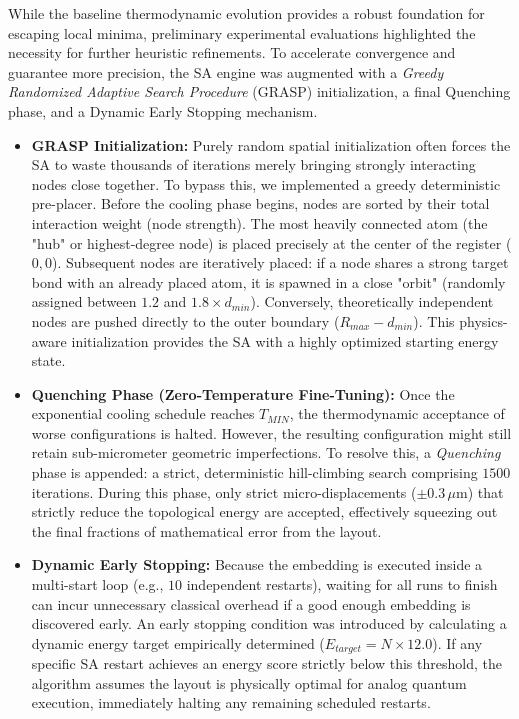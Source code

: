 While the baseline thermodynamic evolution provides a robust foundation for escaping local minima, preliminary experimental evaluations highlighted the necessity for further heuristic refinements. To accelerate convergence and guarantee more precision, the SA engine was augmented with a \textit{Greedy Randomized Adaptive Search Procedure} (GRASP) initialization, a final Quenching phase, and a Dynamic Early Stopping mechanism.

\begin{itemize}
    \item \textbf{GRASP Initialization:} Purely random spatial initialization often forces the SA to waste thousands of iterations merely bringing strongly interacting nodes close together. To bypass this, we implemented a greedy deterministic pre-placer. Before the cooling phase begins, nodes are sorted by their total interaction weight (node strength). The most heavily connected atom (the "hub" or highest-degree node) is placed precisely at the center of the register ($0, 0$). Subsequent nodes are iteratively placed: if a node shares a strong target bond with an already placed atom, it is spawned in a close "orbit" (randomly assigned between $1.2$ and $1.8 \times d_{min}$). Conversely, theoretically independent nodes are pushed directly to the outer boundary ($R_{max} - d_{min}$). This physics-aware initialization provides the SA with a highly optimized starting energy state.
    
    \item \textbf{Quenching Phase (Zero-Temperature Fine-Tuning):} Once the exponential cooling schedule reaches $T_{MIN}$, the thermodynamic acceptance of worse configurations is halted. However, the resulting configuration might still retain sub-micrometer geometric imperfections. To resolve this, a \textit{Quenching} phase is appended: a strict, deterministic hill-climbing search comprising $1500$ iterations. During this phase, only strict micro-displacements ($\pm 0.3\,\mu\text{m}$) that strictly reduce the topological energy are accepted, effectively squeezing out the final fractions of mathematical error from the layout.
    
    \item \textbf{Dynamic Early Stopping:} Because the embedding is executed inside a multi-start loop (e.g., $10$ independent restarts), waiting for all runs to finish can incur unnecessary classical overhead if a good enough embedding is discovered early. An early stopping condition was introduced by calculating a dynamic energy target empirically determined ($E_{target} = N \times 12.0$). If any specific SA restart achieves an energy score strictly below this threshold, the algorithm assumes the layout is physically optimal for analog quantum execution, immediately halting any remaining scheduled restarts.
\end{itemize}

